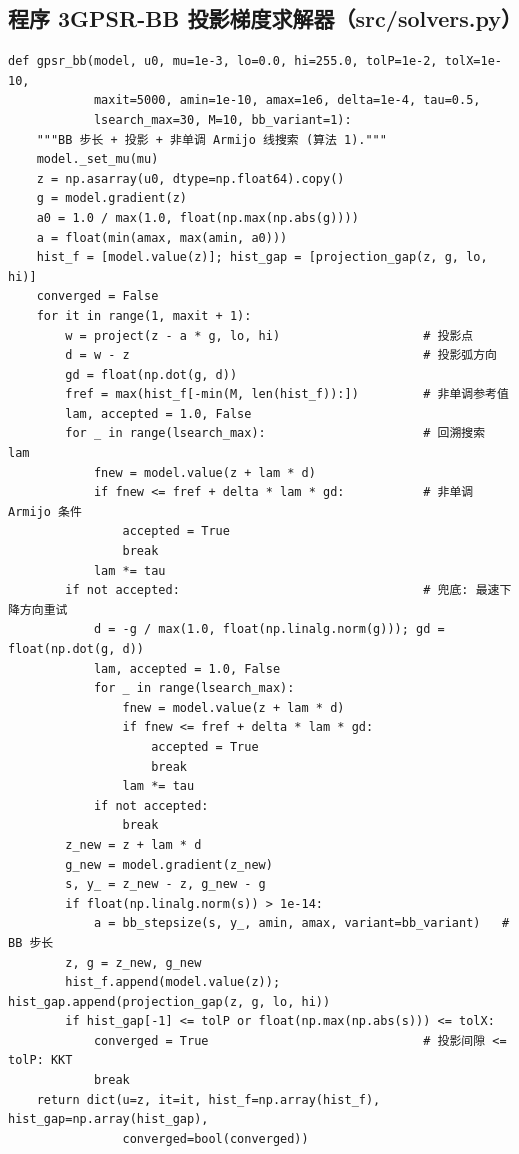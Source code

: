 \documentclass[withoutpreface,bwprint]{cumcmthesis}
\begin{document}
\subsection*{程序 3\quad GPSR-BB 投影梯度求解器（src/solvers.py）}

\begin{lstlisting}[style=appcode]
def gpsr_bb(model, u0, mu=1e-3, lo=0.0, hi=255.0, tolP=1e-2, tolX=1e-10,
            maxit=5000, amin=1e-10, amax=1e6, delta=1e-4, tau=0.5,
            lsearch_max=30, M=10, bb_variant=1):
    """BB 步长 + 投影 + 非单调 Armijo 线搜索 (算法 1)."""
    model._set_mu(mu)
    z = np.asarray(u0, dtype=np.float64).copy()
    g = model.gradient(z)
    a0 = 1.0 / max(1.0, float(np.max(np.abs(g))))
    a = float(min(amax, max(amin, a0)))
    hist_f = [model.value(z)]; hist_gap = [projection_gap(z, g, lo, hi)]
    converged = False
    for it in range(1, maxit + 1):
        w = project(z - a * g, lo, hi)                    # 投影点
        d = w - z                                         # 投影弧方向
        gd = float(np.dot(g, d))
        fref = max(hist_f[-min(M, len(hist_f)):])         # 非单调参考值
        lam, accepted = 1.0, False
        for _ in range(lsearch_max):                      # 回溯搜索 lam
            fnew = model.value(z + lam * d)
            if fnew <= fref + delta * lam * gd:           # 非单调 Armijo 条件
                accepted = True
                break
            lam *= tau
        if not accepted:                                  # 兜底: 最速下降方向重试
            d = -g / max(1.0, float(np.linalg.norm(g))); gd = float(np.dot(g, d))
            lam, accepted = 1.0, False
            for _ in range(lsearch_max):
                fnew = model.value(z + lam * d)
                if fnew <= fref + delta * lam * gd:
                    accepted = True
                    break
                lam *= tau
            if not accepted:
                break
        z_new = z + lam * d
        g_new = model.gradient(z_new)
        s, y_ = z_new - z, g_new - g
        if float(np.linalg.norm(s)) > 1e-14:
            a = bb_stepsize(s, y_, amin, amax, variant=bb_variant)   # BB 步长
        z, g = z_new, g_new
        hist_f.append(model.value(z)); hist_gap.append(projection_gap(z, g, lo, hi))
        if hist_gap[-1] <= tolP or float(np.max(np.abs(s))) <= tolX:
            converged = True                              # 投影间隙 <= tolP: KKT
            break
    return dict(u=z, it=it, hist_f=np.array(hist_f), hist_gap=np.array(hist_gap),
                converged=bool(converged))
\end{lstlisting}
\end{document}
